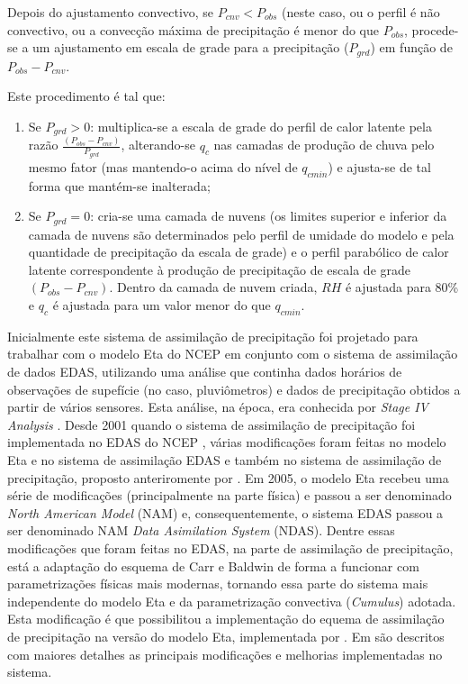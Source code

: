 Depois do ajustamento convectivo, se $P_{cnv}<P_{obs}$ (neste caso, ou o perfil é não convectivo, ou a convecção máxima de precipitação é menor do que $P_{obs}$, procede-se a um ajustamento em escala de grade para a precipitação ($P_{grd}$) em função de $P_{obs}-P_{cnv}$.

Este procedimento é tal que:

\begin{enumerate}
\item Se $P_{grd}>0$: multiplica-se a escala de grade do perfil de calor latente pela razão $\frac{(P_{obs}-P_{cnv})}{P_{grd}}$, alterando-se $q_{c}$ nas camadas de produção de chuva pelo mesmo fator (mas mantendo-o acima do nível de $q_{cmin}$) e ajusta-se de tal forma que mantém-se inalterada;
\item Se $P_{grd}=0$: cria-se uma camada de nuvens (os limites superior e inferior da camada de nuvens são determinados pelo perfil de umidade do modelo e pela quantidade de precipitação da escala de grade) e o perfil parabólico de calor latente correspondente à produção de precipitação de escala de grade $(P_{obs}-P_{cnv})$. Dentro da camada de nuvem criada, $RH$ é ajustada para 80\% e $q_{c}$ é ajustada para um valor menor do que $q_{cmin}$.
\end{enumerate}

Inicialmente este sistema de assimilação de precipitação foi projetado para trabalhar com o modelo Eta do NCEP em conjunto com o sistema de assimilação de dados EDAS, utilizando uma análise que continha dados horários de observações de supefície (no caso, pluviômetros) e dados de precipitação obtidos a partir de vários sensores. Esta análise, na época, era conhecida por \textit{Stage IV Analysis} \cite{linetal01}. Desde 2001 quando o sistema de assimilação de precipitação foi implementada no EDAS do NCEP \cite{rogersetal01}, várias modificações foram feitas no modelo Eta e no sistema de assimilação EDAS e também no sistema de assimilação de precipitação, proposto anteriromente por . Em 2005, o modelo Eta recebeu uma série de modificações (principalmente na parte física) e passou a ser denominado \textit{North American Model} (NAM) e, consequentemente, o sistema EDAS passou a ser denominado NAM \textit{Data Asimilation System} (NDAS). Dentre essas modificações que foram feitas no EDAS, na parte de assimilação de precipitação, está a adaptação do esquema de Carr e Baldwin de forma a funcionar com parametrizações físicas mais modernas, tornando essa parte do sistema mais independente do modelo Eta e da parametrização convectiva (\textit{Cumulus}) adotada. Esta modificação é que possibilitou a implementação do equema de assimilação de precipitação na versão do modelo Eta, implementada por . Em  são descritos com maiores detalhes as principais modificações e melhorias implementadas no sistema.

